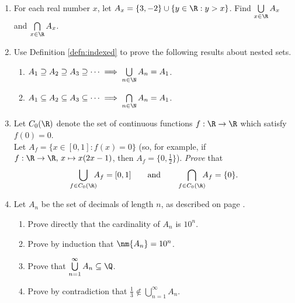 \begin{enumerate}
  \item For each real number $x$, let $A_x=\{3,-2\}\cup\{y\in\R:y>x\}$. Find $\bigcup\limits_{x\in\R}A_x$ and $\bigcap\limits_{x\in\R}A_x$.
  
  \item Use Definition \ref{defn:indexed} to prove the following results about nested sets.
		\begin{enumerate}
  		\item $A_1\supseteq A_2\supseteq A_3\supseteq\cdots\implies \bigcup\limits_{n\in\N}A_n=A_1$.
  		\item $A_1\subseteq A_2\subseteq A_3\subseteq\cdots\implies \bigcap\limits_{n\in\N}A_n=A_1$.
		\end{enumerate}

  \item Let $C_0(\R)$ denote the set of continuous functions $f:\R\to\R$ which satisfy $f(0)=0$.\\
  Let $A_f=\{x\in[0,1]:f(x)=0\}$ (so, for example, if $f:\R\to\R,\,x \mapsto x(2x-1)$, then $A_f=\{0,\frac 12\}$).
    \emph{Prove} that
  \[\bigcup\limits_{f\in C_0(\R)}\negthickspace\negthickspace A_f=[0,1]\qquad\text{and}\qquad\bigcap\limits_{f\in C_0(\R)}\negthickspace\negthickspace A_f=\{0\}.\]
		
	\item Let $A_n$ be the set of decimals of length $n$, as described on page \pageref{ex:finitedec}.
		\begin{enumerate}
	  	\item Prove directly that the cardinality of $A_n$ is $10^n$.
	  	\item Prove by induction that $\nm{A_n}=10^n$.
	  	\item Prove that $\bigcup\limits_{n=1}^\infty A_n\subseteq\Q$.
			\item Prove by contradiction that $\frac 13\not\in\bigcup\limits_{n=1}^\infty A_n$.
		\end{enumerate}


\end{enumerate}
